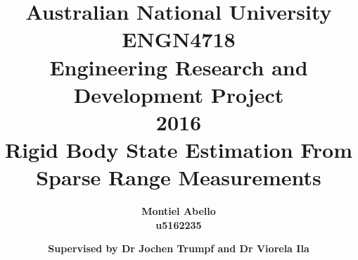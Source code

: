 \documentclass[oneside,openany,11pt]{book}
\begin{document}
\begin{titlepage}
\title{
	\large
		\textbf{Australian National University}\\[0.5cm]
		\textbf{ENGN4718}\\
	 	\textbf{Engineering Research and Development Project}\\
	 	\textbf{2016}\\[2cm]
	\huge
		\textbf{Rigid Body State Estimation From Sparse Range Measurements}\\[2cm]}
\author{
	\large
		\textbf{Montiel Abello}\\
		\textbf{u5162235}}
\date{
	\large
		\vspace{1cm}
		\textbf{Supervised by Dr Jochen Trumpf and Dr Viorela Ila}}
\maketitle
\end{titlepage}
\restoregeometry

\frontmatter


\tableofcontents
%
\listoffigures


\mainmatter

%




 




%
\end{document}
